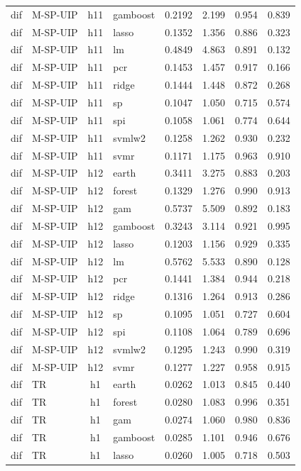 \begin{ThreePartTable}
\begin{longtable}[t]{llclcccc}
dif & M-SP-UIP & h11 & gamboost & 0.2192 & 2.199 & 0.954 & 0.839\\
dif & M-SP-UIP & h11 & lasso & 0.1352 & 1.356 & 0.886 & 0.323\\
dif & M-SP-UIP & h11 & lm & 0.4849 & 4.863 & 0.891 & 0.132\\
dif & M-SP-UIP & h11 & pcr & 0.1453 & 1.457 & 0.917 & 0.166\\
dif & M-SP-UIP & h11 & ridge & 0.1444 & 1.448 & 0.872 & 0.268\\
dif & M-SP-UIP & h11 & sp & 0.1047 & 1.050 & 0.715 & 0.574\\
dif & M-SP-UIP & h11 & spi & 0.1058 & 1.061 & 0.774 & 0.644\\
dif & M-SP-UIP & h11 & svmlw2 & 0.1258 & 1.262 & 0.930 & 0.232\\
dif & M-SP-UIP & h11 & svmr & 0.1171 & 1.175 & 0.963 & 0.910\\
\addlinespace
dif & M-SP-UIP & h12 & earth & 0.3411 & 3.275 & 0.883 & 0.203\\
dif & M-SP-UIP & h12 & forest & 0.1329 & 1.276 & 0.990 & 0.913\\
dif & M-SP-UIP & h12 & gam & 0.5737 & 5.509 & 0.892 & 0.183\\
dif & M-SP-UIP & h12 & gamboost & 0.3243 & 3.114 & 0.921 & 0.995\\
dif & M-SP-UIP & h12 & lasso & 0.1203 & 1.156 & 0.929 & 0.335\\
dif & M-SP-UIP & h12 & lm & 0.5762 & 5.533 & 0.890 & 0.128\\
dif & M-SP-UIP & h12 & pcr & 0.1441 & 1.384 & 0.944 & 0.218\\
dif & M-SP-UIP & h12 & ridge & 0.1316 & 1.264 & 0.913 & 0.286\\
dif & M-SP-UIP & h12 & sp & 0.1095 & 1.051 & 0.727 & 0.604\\
dif & M-SP-UIP & h12 & spi & 0.1108 & 1.064 & 0.789 & 0.696\\
dif & M-SP-UIP & h12 & svmlw2 & 0.1295 & 1.243 & 0.990 & 0.319\\
dif & M-SP-UIP & h12 & svmr & 0.1277 & 1.227 & 0.958 & 0.915\\
\addlinespace
dif & TR & h1 & earth & 0.0262 & 1.013 & 0.845 & 0.440\\
dif & TR & h1 & forest & 0.0280 & 1.083 & 0.996 & 0.351\\
dif & TR & h1 & gam & 0.0274 & 1.060 & 0.980 & 0.836\\
dif & TR & h1 & gamboost & 0.0285 & 1.101 & 0.946 & 0.676\\
dif & TR & h1 & lasso & 0.0260 & 1.005 & 0.718 & 0.503\\

\end{longtable}
\end{ThreePartTable}
